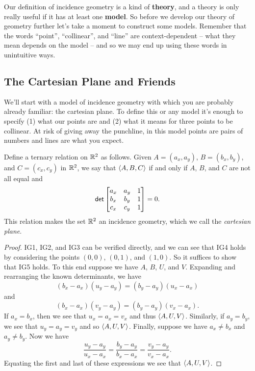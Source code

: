 Our definition of incidence geometry is a kind of \textbf{theory}, and a theory is only really useful if it has at least one \textbf{model}.
So before we develop our theory of geometry further let's take a moment to construct some models.
Remember that the words ``point'', ``collinear'', and ``line'' are context-dependent -- what they mean depends on the model -- and so we may end up using these words in unintuitive ways.



\subsection{The Cartesian Plane and Friends}

We'll start with a model of incidence geometry with which you are probably already familiar: the cartesian plane.
To define this or any model it's enough to specify (1) what our points are and (2) what it means for three points to be collinear.
At risk of giving away the punchline, in this model points are pairs of numbers and lines are what you expect.

\begin{prop} \label{prop:rr2-incidence-geo}
Define a ternary relation on \(\mathbb{R}^2\) as follows.
Given \(A = (a_x, a_y)\), \(B = (b_x, b_y)\), and \(C = (c_x, c_y)\) in \(\mathbb{R}^2\), we say that \(\langle A, B, C \rangle\) if and only if \(A\), \(B\), and \(C\) are not all equal and \[ \mathsf{det} \begin{bmatrix} a_x & a_y & 1 \\ b_x & b_y & 1 \\ c_x & c_y & 1 \end{bmatrix} = 0. \]
This relation makes the set \(\mathbb{R}^2\) an incidence geometry, which we call the \emph{cartesian plane}.
\end{prop}

\begin{proof}
IG1, IG2, and IG3 can be verified directly, and we can see that IG4 holds by considering the points \((0,0)\), \((0,1)\), and \((1,0)\).
So it suffices to show that IG5 holds.
To this end suppose we have \(A\), \(B\), \(U\), and \(V\).
Expanding and rearranging the known determinants, we have \[ (b_x - a_x)(u_y - a_y) = (b_y - a_y)(u_x - a_x) \] and \[ (b_x - a_x)(v_y - a_y) = (b_y - a_y)(v_x - a_x). \]
If \(a_x = b_x\), then we see that \(u_x = a_x = v_x\) and thus \(\langle A, U, V \rangle\).
Similarly, if \(a_y = b_y\), we see that \(u_y = a_y = v_y\) and so \(\langle A, U, V \rangle\).
Finally, suppose we have \(a_x \neq b_x\) and \(a_y \neq b_y\).
Now we have \[ \frac{u_y - a_y}{u_x - a_x} = \frac{b_y - a_y}{b_x - a_x} = \frac{v_y - a_y}{v_x - a_x}. \]
Equating the first and last of these expressions we see that \(\langle A, U, V \rangle\).
\end{proof}

